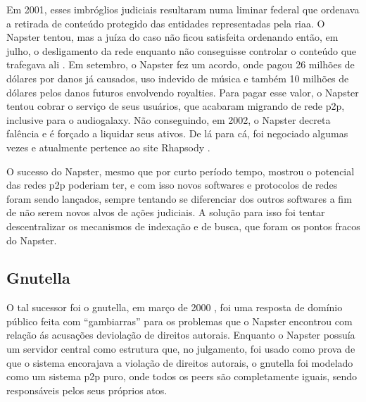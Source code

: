 Em 2001, esses imbróglios judiciais resultaram numa liminar federal que ordenava a
retirada de conteúdo protegido das entidades representadas pela \gls*{riaa}. O Napster
tentou, mas a juíza do caso não ficou satisfeita ordenando então, em julho, o
desligamento da rede enquanto não conseguisse controlar o conteúdo que trafegava ali
\cite{site:wiki-napster}. Em setembro, o Napster fez um acordo, onde pagou 26 milhões de
dólares por danos já causados, uso indevido de música e também 10 milhões de dólares
pelos danos futuros envolvendo royalties. Para pagar esse valor, o Napster tentou cobrar
o serviço de seus usuários, que acabaram migrando de rede \gls*{p2p}, inclusive para o
\gls*{audiogalaxy}. Não conseguindo, em 2002, o Napster decreta falência e é forçado a
liquidar seus ativos. De lá para cá, foi negociado algumas vezes e atualmente pertence
ao site Rhapsody \cite{site:napster-rhapsody}.

O sucesso do Napster, mesmo que por curto período tempo, mostrou o potencial das redes
\gls*{p2p} poderiam ter, e com isso novos softwares e protocolos de redes foram sendo
lançados, sempre tentando se diferenciar dos outros softwares a fim de não serem novos
alvos de ações judiciais. A solução para isso foi tentar descentralizar os mecanismos de
indexação e de busca, que foram os pontos fracos do Napster.

\subsection{Gnutella}

O tal sucessor foi o \gls{gnutella}, em março de 2000 \cite{wiki:gnutella}, foi uma
resposta de domínio público feita com ``gambiarras'' para os problemas que o Napster
encontrou com relação ás acusações deviolação de direitos autorais. Enquanto o Napster
possuía um servidor central como estrutura que, no julgamento, foi usado como prova de
que o sistema encorajava a violação de direitos autorais, o \gls*{gnutella} foi modelado
como um sistema \gls*{p2p} puro, onde todos os \glspl*{peer} são completamente iguais,
sendo responsáveis pelos seus próprios atos.

